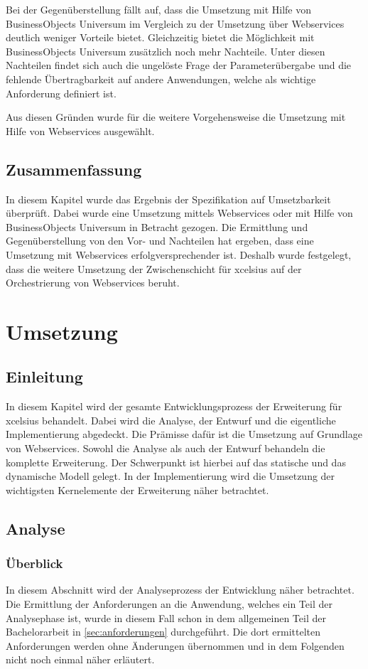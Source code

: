\begin{onehalfspacing}
Bei der Gegenüberstellung fällt auf, dass die Umsetzung mit Hilfe von BusinessObjects Universum im Vergleich zu der Umsetzung über Webservices deutlich weniger Vorteile bietet. Gleichzeitig bietet die Möglichkeit mit BusinessObjects Universum zusätzlich noch mehr Nachteile. Unter diesen Nachteilen findet sich auch die ungelöste Frage der Parameterübergabe und die fehlende Übertragbarkeit auf andere Anwendungen, welche als wichtige Anforderung definiert ist.

Aus diesen Gründen wurde für die weitere Vorgehensweise die Umsetzung mit Hilfe von Webservices ausgewählt.

\section{Zusammenfassung}
In diesem Kapitel wurde das Ergebnis der Spezifikation auf Umsetzbarkeit überprüft. Dabei wurde eine Umsetzung mittels Webservices oder mit Hilfe von BusinessObjects Universum in Betracht gezogen. Die Ermittlung und Gegenüberstellung von den Vor- und Nachteilen hat ergeben, dass eine Umsetzung mit Webservices erfolgversprechender ist. Deshalb wurde festgelegt, dass die weitere Umsetzung der Zwischenschicht für \gls{xcelsius} auf der Orchestrierung von Webservices beruht.

\chapter{Umsetzung}

\section{Einleitung}
In diesem Kapitel wird der gesamte Entwicklungsprozess der Erweiterung für \gls{xcelsius} behandelt. Dabei wird die Analyse, der Entwurf und die eigentliche Implementierung abgedeckt. Die Prämisse dafür ist die Umsetzung auf Grundlage von Webservices. Sowohl die Analyse als auch der Entwurf behandeln die komplette Erweiterung. Der Schwerpunkt ist hierbei auf das statische und das dynamische Modell gelegt. In der Implementierung wird die Umsetzung der wichtigsten Kernelemente der Erweiterung näher betrachtet.

\section{Analyse}

\subsection{Überblick}
In diesem Abschnitt wird der Analyseprozess der Entwicklung näher betrachtet. Die Ermittlung der Anforderungen an die Anwendung, welches ein Teil der Analysephase ist, wurde in diesem Fall schon in dem allgemeinen Teil der Bachelorarbeit in \vref{sec:anforderungen} durchgeführt. Die dort ermittelten Anforderungen werden ohne Änderungen übernommen und in dem Folgenden nicht noch einmal näher erläutert.


\end{onehalfspacing}
